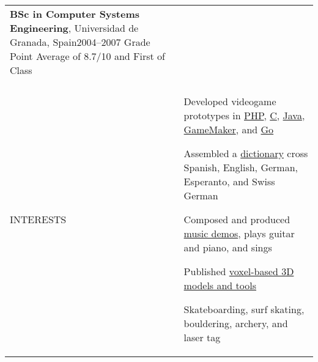 \documentclass[letterpaper,10pt,oneside]{article}
\newcommand{\DatestampY}[1]{#1}
\newenvironment{body}
{\par\par
\begin{longtable}{p{0.142\textwidth}p{0.807\textwidth}}}
{\par\end{longtable}\par}
\renewcommand{\section}[3]{\\[-0.9cm]\pdfbookmark[2]{#2}{#3}\\%
\raggedleft  %
{\fontsize{9.5pt}{9.5pt}\selectfont\bfseries\raggedright%
\MakeUppercase{#1}}&}
\newcommand{\SmallEntryGap}{\par\vspace{0.1em}\par}
\begin{document}
\begin{body}
\SmallEntryGap

\textbf{BSc in Computer Systems Engineering}, Universidad de Granada, Spain\hfill \DatestampY{2004}--\DatestampY{2007} \newline
\phantom{w}Grade Point Average of 8.7/10 and First of Class


\section{Interests}{Interests}{PDF:Open Source}

Developed videogame prototypes in \href{https://github.com/lquesada/LifoSource}{PHP}, \href{https://github.com/lquesada/SpaceARMy}{C}, \href{https://github.com/lquesada/RogueCave}{Java}, \href{https://github.com/lquesada/PhysicsEngine}{GameMaker}, and \href{https://github.com/lquesada/Cavernal}{Go}

Assembled a \href{https://github.com/lquesada/Lingvaro}{dictionary} cross Spanish, English, German, Esperanto, and Swiss German

Composed and produced \href{https://github.com/lquesada/music}{music demos}, plays guitar and piano, and sings

Published \href{https://github.com/lquesada/voxel-3d-models}{voxel-based 3D models and tools}

Skateboarding, surf skating, bouldering, archery, and laser tag

\end{body}
\end{document}
